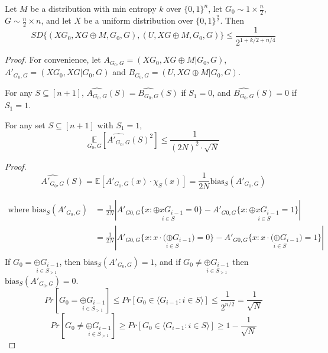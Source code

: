 \begin{theorem}
Let $M$ be a distribution with min entropy $k$ over $\{0 , 1 \}^n$, let $G_0 \sim 1 \times \frac{n}{2}$, $G \sim \frac{n}{2} \times n$, and let $X$ be a uniform distribution over $\{ 0, 1 \} ^ \frac{n}{2}$. Then 
$$SD \{ (XG_0, XG \oplus M, G_0, G), (U, XG \oplus M, G_0, G) \} \leq 
\frac{1}{2^{1+k/2+n/4}}$$
\end{theorem}

\begin{proof}
For convenience, let $A_{G_0, G} = (XG_0, XG \oplus M | G_0 , G)$, 
$A'_{G_0,G} = (XG_0, XG | G_0 , G) $ and
$B_{G_0,G} = (U, XG \oplus M | G_0 , G)$.

\begin{claim}
For any $S \subseteq [n+1]$, $\widehat{A_{G_0,G}}(S) = \widehat{B_{G_0,G}}(S)$ if $S_1 = 0$, and 
$\widehat{B_{G_0,G}}(S) = 0$ if $S_1 = 1$.
\end{claim} 

\begin{claim}
For any set $S \subseteq [n+1]$ with $S_1 =1$, 
$$\underset{G_0, G} {\mathbb{E}} 
	[\widehat{A'_{G_0,G}}(S)^2] \leq \frac{1}{(2N)^2 \cdot \sqrt N} $$
\end{claim}

\textit{Proof.}
$$ \widehat{A'_{G_0,G}}(S) = \mathbb{E}[A'_{G_0,G}(x) \cdot \chi_S(x)]
= \frac{1}{2N} \text{bias}_S(A'_{G_0, G})$$

\begin{align*}
\text{where }
\text{bias}_S(A'_{G_0, G})
&= \frac{1}{2N} \left| 
	A'_{G0,G} \{ x : \underset{i \in S} {\oplus xG_{i-1}} = 0 \} - 
	A'_{G0,G} \{ x : \underset{i \in S} {\oplus xG_{i-1}} = 1 \} 
	\right| \\
&= \frac{1}{2N} \left| 
	A'_{G0,G} \{ x : \underset{i \in S} {x \cdot (\oplus G_{i-1}}) = 0 \} - 
	A'_{G0,G} \{ x : \underset{i \in S} {x \cdot (\oplus G_{i-1}}) = 1 \} 
	\right| \\
\end{align*}
If $G_0 = \underset{i \in S_{>1}} {\oplus G_{i-1}}$, then $\text{bias}_S (A'_{G_0, G}) = 1$, and if $G_0 \neq  \underset{i \in S_{>1}} {\oplus G_{i-1}}$ then $\text{bias}_S (A'_{G_0, G}) = 0$. \\
$$Pr[G_0 =  \underset{i \in S_{>1}} {\oplus G_{i-1}}]  
\leq Pr[G_0 \in {\langle G_{i-1} : i \in S \rangle}] \leq \frac{1}{2^{n/2}}= \frac{1}{\sqrt{N}}$$
$$Pr[G_0 \neq  \underset{i \in S_{>1}} {\oplus G_{i-1}}]  
\geq Pr[G_0 \in {\langle G_{i-1} : i \in S \rangle}] \geq 1 - \frac{1}{\sqrt{N}}$$


\end{proof}
